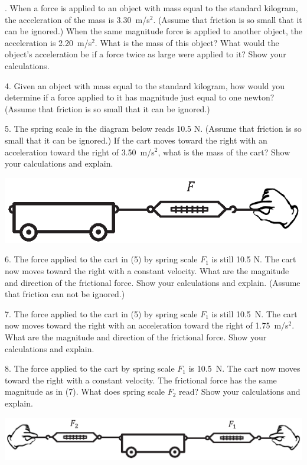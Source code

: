 . When a force is applied to an object with mass equal to the standard kilogram,
the acceleration of the mass is 3.30~m/s$^2$. (Assume that friction is so small
that it can be ignored.) When the same magnitude force is applied to another
object, the acceleration is 2.20~m/s$^2$. What is the mass of this object? What
would the object's acceleration be if a force twice as large were applied to
it? Show your calculations.
\answerspace{18mm}

4. Given an object with mass equal to the standard kilogram, how would you determine
if a force applied to it has magnitude just equal to one newton? (Assume that
friction is so small that it can be ignored.)
\answerspace{18mm}

5. The spring scale in the diagram below reads 10.5 N. (Assume that friction
is so small that it can be ignored.)
If the cart moves toward the right with an acceleration toward the right of
3.50~m/s$^2$, what is the mass of the cart? Show your calculations and explain.

\includegraphics{force_mass/cart_plus_scale.eps}
\answerspace{13mm}


6. The force applied to the cart in (5) by spring scale \( F_{1} \) is still
10.5 N. The cart now moves toward the right with a constant velocity. What are
the magnitude and direction of the frictional force. Show your calculations
and explain. (Assume that friction can not be ignored.)
\answerspace{18mm}

7. The force applied to the cart in (5) by spring scale \( F_{1} \) is still
10.5~N. The cart now moves toward the right with an acceleration toward the
right of 1.75~m/s$^2$. What are the magnitude and direction of the frictional
force. Show your calculations and explain.
\answerspace{18mm}

8. The force applied to the cart by spring scale \( F_{1} \) is 10.5~N.
The cart now moves toward the right with a constant velocity. The frictional
force has the same magnitude as in (7). What does spring scale \( F_{2} \)
read? Show your calculations and explain.

\includegraphics{force_mass/cart_plus_two_scales.eps}

